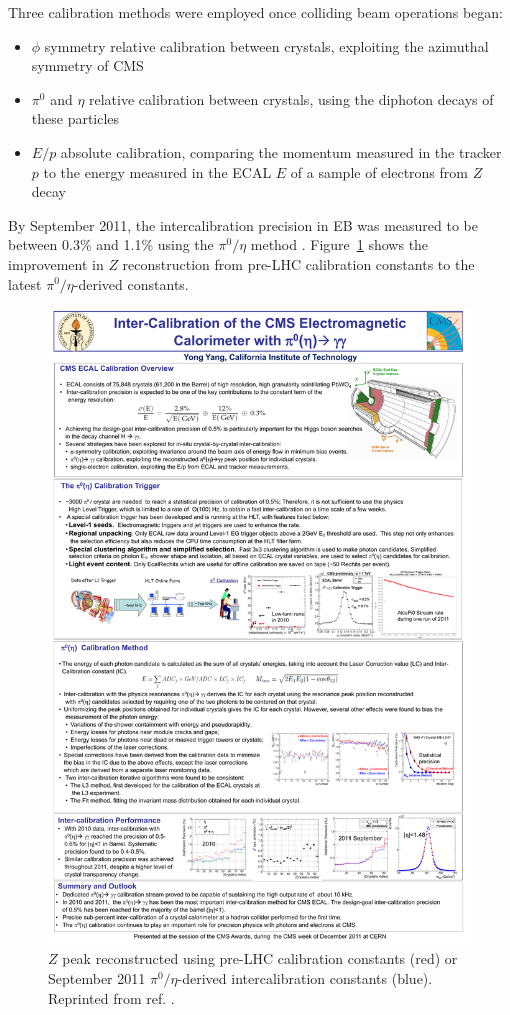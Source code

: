 \documentclass[dissertation.tex]{subfiles}
\begin{document}
Three calibration methods were employed once colliding beam operations began:

\begin{itemize}
\item $\phi$ symmetry relative calibration between crystals, exploiting the azimuthal symmetry of CMS
\item $\pi^{0}$ and $\eta$ relative calibration between crystals, using the diphoton decays of these particles
\item $E/p$ absolute calibration, comparing the momentum measured in the tracker $p$ to the energy measured in the ECAL $E$ of a sample of electrons from $Z$ decay
\end{itemize}
%
By September 2011, the intercalibration precision in EB was measured to be between 0.3\% and 1.1\% using the $\pi^{0}/\eta$ method \cite{Yang}.  Figure~\ref{fig:intercalibration} shows the improvement in $Z$ reconstruction from pre-LHC calibration constants to the latest $\pi^{0}/\eta$-derived constants.

\begin{figure}
	\centering
	\includegraphics[scale=1.0]{intercalibration}
	\caption{$Z$ peak reconstructed using pre-LHC calibration constants (red) or September 2011 $\pi^{0}/\eta$-derived intercalibration constants (blue).  Reprinted from ref. \cite{Yang}.}
	\label{fig:intercalibration}
\end{figure}
\end{document}
